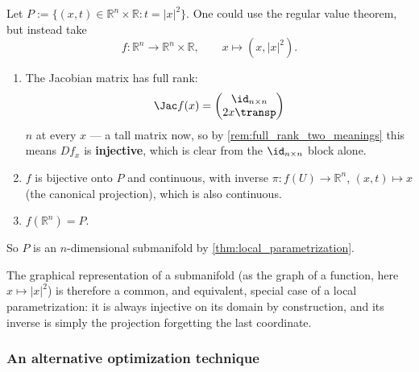 \begin{example}
Let $P := \{(x,t) \in \mathbb{R}^n\times\mathbb{R} : t=|x|^2\}$. One could use the regular value
theorem, but instead take
\[f : \mathbb{R}^n \to \mathbb{R}^n\times\mathbb{R}, \qquad x \mapsto (x,|x|^2).\]
\begin{enumerate}[label=\textbf{\arabic*.}]
  \item The Jacobian matrix has full rank:
\[ \Jac f(x) = \begin{pmatrix} \id_{n\times n} \\ 2x\transp \end{pmatrix} \]
    $n$ at every $x$ --- a tall matrix now, so by \cref{rem:full_rank_two_meanings} this means
    $Df_x$ is \textbf{injective}, which is clear from the $\id_{n\times n}$ block alone.
  \item $f$ is bijective onto $P$ and continuous, with inverse $\pi : f(U) \to \mathbb{R}^n$,
    $(x,t) \mapsto x$ (the canonical projection), which is also continuous.
  \item $f(\mathbb{R}^n) = P$.
\end{enumerate}
So $P$ is an $n$-dimensional submanifold by \cref{thm:local_parametrization}.

\begin{remark}
The graphical representation of a submanifold (as the graph of a function, here $x \mapsto |x|^2$)
is therefore a common, and equivalent, special case of a local parametrization: it is always
injective on its domain by construction, and its inverse is simply the projection forgetting the
last coordinate.
\end{remark}
\end{example}

\begin{center}
\end{center}

\subsubsection{An alternative optimization technique}

